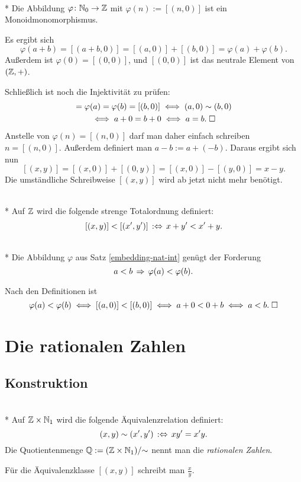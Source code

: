 \begin{Satz}%
\label{embedding-nat-int}\mbox{}\\*
Die Abbildung $\varphi\colon\mathbb N_0\to\mathbb Z$ mit $\varphi(n):=[(n,0)]$
ist ein Monoidmonomorphismus.
\end{Satz}
 Es ergibt sich
\[\varphi(a+b) = [(a+b,0)] = [(a,0)]+[(b,0)] = \varphi(a)+\varphi(b).\]
Außerdem ist $\varphi(0)=[(0,0)]$, und $[(0,0)]$
ist das neutrale Element von $(\mathbb Z,+)$.

Schließlich ist noch die Injektivität zu prüfen:
\begin{gather*}
[(a,0)] = \varphi(a) = \varphi(b)  = [(b,0)]\iff (a,0)\sim (b,0)\\
\iff a+0 = b+0 \iff a=b.\;\qedsymbol
\end{gather*}
Anstelle von $\varphi(n)=[(n,0)]$ darf man daher einfach schreiben
$n=[(n,0)]$. Außerdem definiert man $a-b:=a+(-b)$. Daraus
ergibt sich nun
\[[(x,y)] = [(x,0)]+[(0,y)] = [(x,0)] - [(y,0)] = x-y.\]
Die umständliche Schreibweise $[(x,y)]$ wird ab jetzt nicht
mehr benötigt.

\begin{Definition}\mbox{}\\*
Auf $\mathbb Z$ wird die folgende strenge Totalordnung definiert:
\[[(x,y)] < [(x',y')]\,:\Leftrightarrow\, x+y'<x'+y.\]
\end{Definition}

\begin{Satz}\mbox{}\\*
Die Abbildung $\varphi$ aus Satz \ref{embedding-nat-int}
genügt der Forderung
\[a<b\,\Rightarrow\, \varphi(a)<\varphi(b).\]
\end{Satz}
 Nach den Definitionen ist
\[\varphi(a)<\varphi(b)\iff [(a,0)]<[(b,0)]\iff a+0<0+b\iff a<b.\;\Box\]


\section{Die rationalen Zahlen}

\subsection{Konstruktion}

\begin{Definition}\mbox{}\\*
Auf $\mathbb Z\times\mathbb N_1$ wird die folgende Äquivalenzrelation definiert:
\[(x,y)\sim (x',y')\,:\Leftrightarrow\, xy' = x'y.\]
Die Quotientenmenge $\mathbb Q := (\mathbb Z\times\mathbb N_1)/{\sim}$ nennt man
die \emph{rationalen Zahlen}.
\end{Definition}
Für die Äquivalenzklasse $[(x,y)]$ schreibt man $\frac{x}{y}$.


